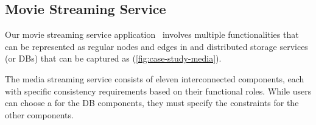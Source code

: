 \subsection{Movie Streaming Service}

Our movie streaming service application~\cite{gan2019an} involves
multiple functionalities that can be represented as
regular nodes and edges in \sysgraph{} and distributed storage services (or DBs)
that can be captured as \sysmods{} (\cref{fig:case-study-media}).

The media streaming service consists of eleven interconnected
components, each with specific consistency requirements based on
their functional roles. While users can choose a \sysmod{} for the
DB components, they must specify the constraints for the other components.



